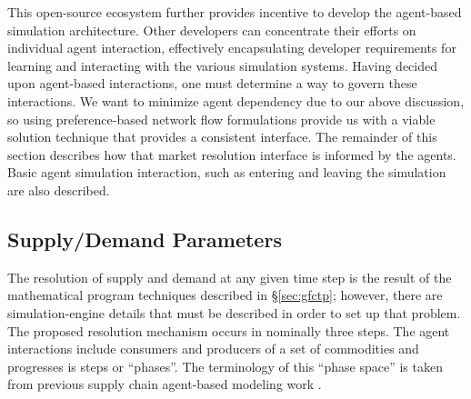 This open-source ecosystem further provides incentive to develop the agent-based
simulation architecture. Other developers can concentrate their efforts on
individual agent interaction, effectively encapsulating developer requirements
for learning and interacting with the various simulation systems. Having decided
upon agent-based interactions, one must determine a way to govern these
interactions. We want to minimize agent dependency due to our above discussion,
so using preference-based network flow formulations provide us with a viable
solution technique that provides a consistent interface. The remainder of this
section describes how that market resolution interface is informed by the
agents. Basic agent simulation interaction, such as entering and leaving the
simulation are also described.

\subsection{Supply/Demand Parameters}

The resolution of supply and demand at any given time step is the result of the
mathematical program techniques described in \S\ref{sec:gfctp}; however, there
are simulation-engine details that must be described in order to set up that
problem. The proposed resolution mechanism occurs in nominally three steps. The
agent interactions include consumers and producers of a set of commodities and
progresses is steps or ``phases''. The terminology of this ``phase space'' is
taken from previous supply chain agent-based modeling
work \cite{julka_agent-based_2002}.

